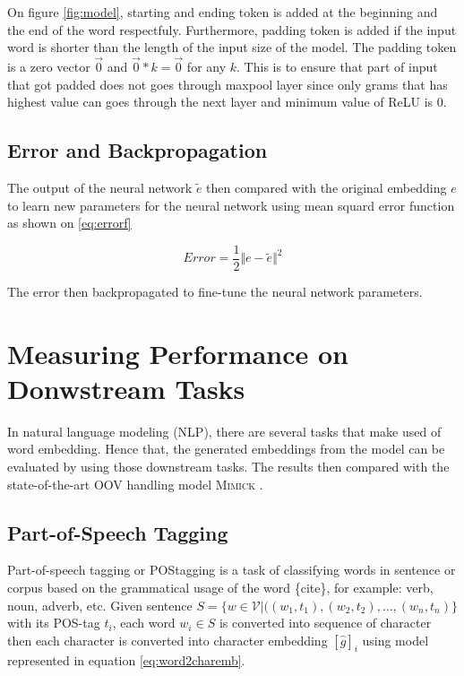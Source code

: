         On figure \ref{fig:model}, starting and ending token is added
        at the beginning and the end of the word respectfuly.
        Furthermore, padding token is added if the input word is
        shorter than the length of the input size of the model. The
        padding token is a zero vector $\vec{0}$ and $\vec{0} * k =
        \vec{0}$ for any $k$. This is to ensure that part of input
        that got padded does not goes through maxpool layer since only
        grams that has highest value can goes through the next layer
        and minimum value of ReLU is 0.

    \subsection{Error and Backpropagation}
        The output of the neural network $\tilde{e}$ then compared
        with the original embedding $e$ to learn new parameters for
        the neural network using mean squard error function as shown
        on \ref{eq:errorf}

        \begin{equation}
            \label{eq:errorf}
            Error = \frac{1}{2} \Vert e - \tilde{e} \Vert ^{2}
        \end{equation}

        The error then backpropagated to fine-tune the neural network
        parameters.
        
\section{Measuring Performance on Donwstream Tasks}
    In natural language modeling (NLP), there are several tasks that
    make used of word embedding. Hence that, the generated embeddings
    from the model can be evaluated by using those downstream tasks.
    The results then compared with the state-of-the-art OOV handling
    model \textsc{Mimick} \cite{mimicking2017Pinter}.
    
    \subsection{Part-of-Speech Tagging}
        Part-of-speech tagging or POStagging is a task of classifying
        words in sentence or corpus based on the grammatical usage of
        the word \{cite\}, for example: verb, noun, adverb, etc. Given
        sentence $S = \{w \in \mathcal{V} \vert ((w_1, t_1), (w_2,
        t_2), \dots, (w_n, t_n)\}$ with its POS-tag $t_i$, each word
        $w_i \in S$ is converted into sequence of character then each
        character is converted into character embedding $[\hat{g}]_i$
        using model represented in equation \ref{eq:word2charemb}.

